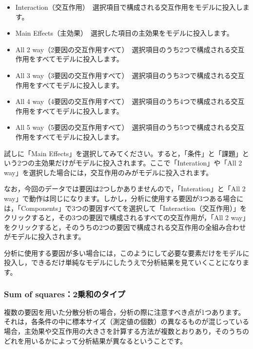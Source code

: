 \documentclass[
  12pt,
  a5jpaper,
  lualatex, ja=standard]{bxjsbook}
\providecommand{\tightlist}{%
  \setlength{\itemsep}{0pt}\setlength{\parskip}{0pt}}
\newenvironment{jmvsettings}{%
	\begin{center}%
	\begin{tcolorbox}[%
		title=設定項目,
		colframe=gmoji,
		colbacktitle=gmoji,
		colback=gmoji!2!white,
		breakable,
		width=.9\textwidth,
		]\small\addtolength{\leftmargini}{-3\labelsep}%
	}%
	{\end{tcolorbox}\end{center}}
\begin{document}
\begin{jmvsettings}

\begin{itemize}
\tightlist
\item
  Interaction（交互作用）　選択項目で構成される交互作用をモデルに投入します。
\item
  Main Effects（主効果）　選択した項目の主効果をモデルに投入します。
\item
  All 2 way（2要因の交互作用すべて）　選択項目のうち2つで構成される交互作用をすべてモデルに投入します。
\item
  All 3 way（3要因の交互作用すべて）　選択項目のうち3つで構成される交互作用をすべてモデルに投入します。
\item
  All 4 way（4要因の交互作用すべて）　選択項目のうち4つで構成される交互作用をすべてモデルに投入します。
\item
  All 5 way（5要因の交互作用すべて）　選択項目のうち5つで構成される交互作用をすべてモデルに投入します。
\end{itemize}

\end{jmvsettings}

試しに「Main Effects」を選択してみてください。すると，「条件」と「課題」という2つの主効果だけがモデルに投入されます。ここで「Interation」や「All 2 way」を選択した場合には，交互作用のみがモデルに投入されます。

なお，今回のデータでは要因は2つしかありませんので，「Interation」と「All 2 way」で動作は同じになります。しかし，分析に使用する要因が3つある場合には，「Components」で3つの要因すべてを選択して「Interaction（交互作用）」をクリックすると，その3つの要因で構成されるすべての交互作用が，「All 2 way」をクリックすると，そのうちの2つの要因で構成される交互作用の全組み合わせがモデルに投入されます。

分析に使用する要因が多い場合には，このようにして必要な要素だけをモデルに投入し，できるだけ単純なモデルにしたうえで分析結果を見ていくことになります。

\hypertarget{sum-of-squares2ux4e57ux548cux306eux30bfux30a4ux30d7}{%
\subsubsection*{Sum of squares：2乗和のタイプ}\label{sum-of-squares2ux4e57ux548cux306eux30bfux30a4ux30d7}}

複数の要因を用いた分散分析の場合，分析の際に注意すべき点が1つあります。それは，各条件の中に標本サイズ（測定値の個数）の異なるものが混じっている場合，主効果や交互作用の大きさを計算する方法が複数とおりあり，そのうちのどれを用いるかによって分析結果が異なるということです。
\end{document}
